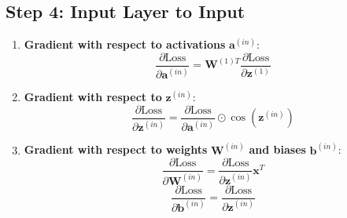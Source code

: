 \documentclass{article}
\begin{document}
\subsection*{Step 4: Input Layer to Input}
\begin{enumerate}
  \item \textbf{Gradient with respect to activations} $\mathbf{a}^{(in)}$:
  \[
  \frac{\partial \text{Loss}}{\partial \mathbf{a}^{(in)}} = \mathbf{W}^{(1)T} \frac{\partial \text{Loss}}{\partial \mathbf{z}^{(1)}}
  \]

  \item \textbf{Gradient with respect to} $\mathbf{z}^{(in)}$:
  \[
  \frac{\partial \text{Loss}}{\partial \mathbf{z}^{(in)}} = \frac{\partial \text{Loss}}{\partial \mathbf{a}^{(in)}} \odot \cos(\mathbf{z}^{(in)})
  \]

  \item \textbf{Gradient with respect to weights} $\mathbf{W}^{(in)}$ \textbf{and biases} $\mathbf{b}^{(in)}$:
  \[
  \frac{\partial \text{Loss}}{\partial \mathbf{W}^{(in)}} = \frac{\partial \text{Loss}}{\partial \mathbf{z}^{(in)}} \mathbf{x}^T
  \]
  \[
  \frac{\partial \text{Loss}}{\partial \mathbf{b}^{(in)}} = \frac{\partial \text{Loss}}{\partial \mathbf{z}^{(in)}}
  \]
\end{enumerate}
\end{document}
